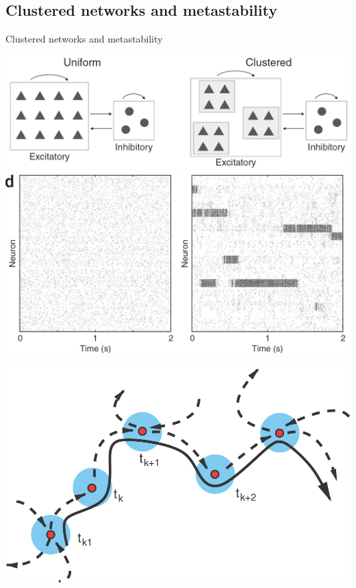 \documentclass[fleqn]{beamer}
\newcommand{\ppc}[1]{\pause\setcounter{page}{#1}}
\begin{document}
\subsection{Clustered networks and metastability}


\begin{frame}{Clustered networks and metastability}
   \begin{minipage}{.48\linewidth}
   \begin{center}
	\includegraphics[width=\textwidth]{figures/doiron3}
	\vspace*{.1cm}
	\includegraphics[width=\textwidth]{figures/doiron4}  
    \end{center}
        \begin{flushright}
      {\footnotesize \cite{Litwin-Kumar2012}}
    \end{flushright}
  \end{minipage}\ppc{12}
\begin{minipage}{.48\linewidth}
 \begin{center}
    \includegraphics[width=.9\textwidth]{figures/rabinovich1}

\end{center}
\end{minipage}
\end{frame}
\end{document}
